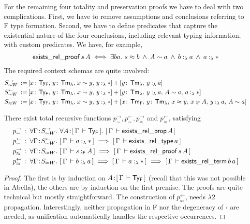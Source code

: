 \documentclass[a4paper,UKenglish]{lipics-v2016}
\newcommand{\ms}{\,}
\newcommand{\mrel}[1]{\mathrel{\ms #1 \ms}}
\newcommand{\OF}{\mrel{:}}
\newcommand{\mAnd}{\mrel{\wedge}}
\newcommand{\mAll}[1]{\ensuremath{\forall} #1.\ms\ms}
\newcommand{\mEx}[1]{\ensuremath{\exists} #1.\ms\ms}
\newcommand{\eqdef}{\mrel{:=}}
\newcommand{\SysL}{$\lambda2$\xspace}
\newcommand{\TyF}{\ensuremath{\mathsf{Ty_{F}}}}
\newcommand{\TmF}{\ensuremath{\mathsf{Tm_{F}}}}
\newcommand{\TmL}{\ensuremath{\mathsf{Tm_{\lambda}}}}
\newcommand{\of}{\ensuremath{\!:\!}}
\newcommand{\typingFh}[2]{\ensuremath{#1 \mathbin{:_{\mathsf{F}}} #2}}
\newcommand{\typingLh}[2]{\ensuremath{#1 \mathbin{:_{\lambda}} #2}}
\newcommand{\tyr}{\mathrel{\sim}}
\newcommand{\tmr}{\mathrel{\approx}}
\newcommand{\Prp}{\ensuremath{\textrm{\textasteriskcentered}}}
\newcommand{\Typ}{\ensuremath{\square}}
\theoremstyle{plain}
\begin{document}
For the remaining four totality and preservation proofs we have to deal with two complications.
First, we have to remove assumptions and conclusions referring to F type formation.
Second, we have to define predicates that capture the existential nature of the four conclusions, including relevant typing information, with custom predicates.
We have, for example,
\begin{align*}
  \mathsf{exists\_rel\_proof}\,s\,A \iff \mEx{ba} s \tmr b \mAnd A \tyr a \mAnd \typingLh{b}{a} \mAnd \typingLh{a}{\Prp}
\end{align*}
The required context schemas are quite involved:
\begin{align*}
  S_{\tyr W}^{\rightarrow} \eqdef &[x\sof\TyF \ssep y\sof\TmL \ssep x \tyr y \ssep \typingLh{y}{\Prp}] + [y\sof\TmL \ssep \typingLh{y}{a}]\\
  S_{\tyr W}^{\leftarrow} \eqdef &[x\sof\TyF \ssep y\sof\TmL \ssep x \tyr y \ssep \typingLh{y}{\Prp}] + [y\sof\TmL \ssep \typingLh{y}{a} \ssep A \tyr a \ssep \typingLh{a}{\Prp}]\\
  S_{\tmr W} \eqdef &[x\sof\TyF \ssep y\sof\TmL \ssep x \tyr y \ssep \typingLh{y}{\Prp}] + [x\sof\TmF \ssep y\sof\TmL \ssep x \tmr y \ssep \typingFh{x}{A} \ssep \typingLh{y}{a} \ssep A \tyr a]
\end{align*}
\begin{lemma}
  There exist total recursive functions $p^{\rightarrow}_{\tyr},p^{\leftarrow}_{\tyr},p^{\rightarrow}_{\tmr}$ and $p^{\leftarrow}_{\tmr}$, satisfying
  \begin{align*}
    p^{\rightarrow}_{\tyr} &\OF  \mAll{\Gamma \of S_{\tyr W}^{\rightarrow}} \mAll{A \of \bc{\Gamma}{\TyF}} \bc{\Gamma}{\mathsf{exists\_rel\_prop}\,A}\\
    p^{\leftarrow}_{\tyr} &\OF \mAll{\Gamma \of S_{\tyr W}^{\leftarrow}} \bc{\Gamma}{\typingLh{a}{\Prp}} \implies \bc{\Gamma}{\mathsf{exists\_rel\_type}\,a}\\
    p^{\rightarrow}_{\tmr} &\OF \mAll{\Gamma \of S_{\tmr W}} \bc{\Gamma}{\typingFh{s}{A}} \implies \bc{\Gamma}{\mathsf{exists\_rel\_proof}\,s\,A}\\
    p^{\leftarrow}_{\tmr} &\OF \mAll{\Gamma \of S_{\tmr W}} \bc{\Gamma}{\typingLh{b}{a}} \implies \bc{\Gamma}{\typingLh{a}{\Prp}} \implies \bc{\Gamma}{\mathsf{exists\_rel\_term}\,b\,a}
  \end{align*}
\end{lemma}
\begin{proof}
  The first is by induction on $A \of \bc{\Gamma}{\TyF}$ (recall that this was not possible in Abella), the others are by induction on the first premise.
  The proofs are quite technical but mostly straightforward.
  The construction of $p^{\leftarrow}_{\tmr}$, needs \SysL propagation.
  Interestingly, neither propagation in F nor the degeneracy of $\Typ$ are needed, as unification automatically handles the respective occurrences.
\end{proof}
\end{document}
